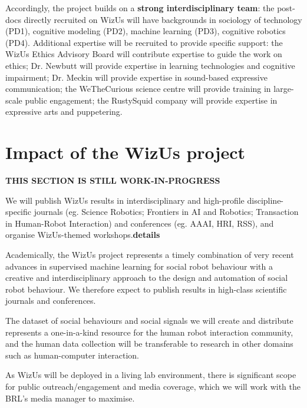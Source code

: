 \documentclass[11pt,a4paper]{report}
\newcommand{\project}{WizUs\xspace}
\newcommand{\TODO}[1]{{\color{red}\textbf{#1}}}
\begin{document}
Accordingly, the project builds on a \textbf{strong interdisciplinary team}: the
post-docs directly recruited on \project will have backgrounds in sociology of
technology (PD1), cognitive modeling (PD2), machine learning (PD3), cognitive
robotics (PD4). Additional expertise will be recruited to provide specific
support: the \project Ethics Advisory Board will contribute expertise to guide
the work on ethics; Dr. Newbutt will provide expertise in learning technologies
and cognitive impairment; Dr. Meckin will provide expertise in sound-based
expressive communication; the WeTheCurious science centre will provide training in
large-scale public engagement; the RustySquid company will provide expertise in
expressive arts and puppetering.

\section{Impact of the \project project}
\TODO{THIS SECTION IS STILL WORK-IN-PROGRESS}


We will
publish \project results in interdisciplinary and high-profile
discipline-specific journals (eg. Science Robotics; Frontiers in AI and Robotics;
Transaction in Human-Robot Interaction) and conferences (eg. AAAI, HRI, RSS), and
organise \project-themed workshops.\TODO{details}



Academically, the \project project represents a timely combination of
very recent advances in supervised machine learning for social robot
behaviour with a creative and interdisciplinary approach to the design
and automation of social robot behaviour. We therefore expect to publish
results in high-class scientific journals and conferences.

The dataset of social behaviours and social signals we will create and
distribute represents a one-in-a-kind resource for the human robot
interaction community, and the human data collection will be
transferable to research in other domains such as human-computer
interaction.

As \project will be deployed in a living lab environment, there is
significant scope for public outreach/engagement and media coverage,
which we will work with the BRL's media manager to maximise.
\end{document}
